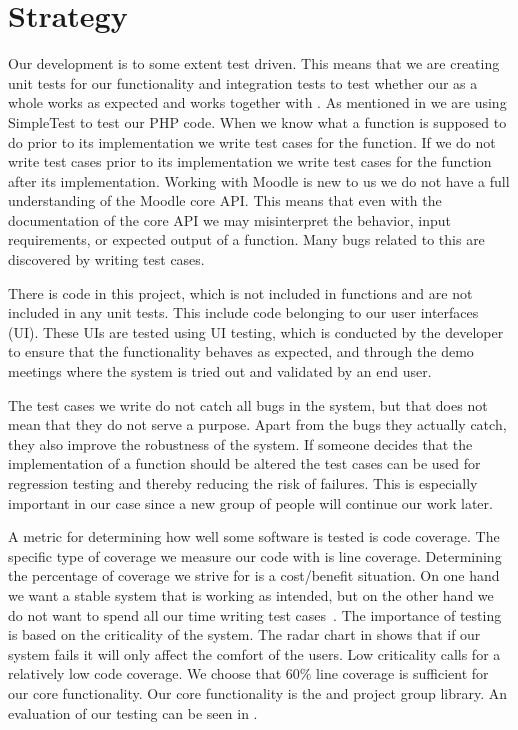 \section{Strategy}
\label{sec:strategy}
\newcommand{\idealCC}{$60\%$}
Our development is to some extent test driven.
This means that we are creating unit tests for our functionality and integration tests to test whether our \subsystem{} as a whole works as expected and works together with \moodle{}.
As mentioned in  we are using SimpleTest to test our PHP code.
When we know what a function is supposed to do prior to its implementation we write test cases for the function.
If we do not write test cases prior to its implementation we write test cases for the function after its implementation. 
Working with Moodle is new to us we do not have a full understanding of the Moodle core API.
This means that even with the documentation of the \moodle{} core API we may misinterpret the behavior, input requirements, or expected output of a function.
Many bugs related to this are discovered by writing test cases.

There is code in this project, which is not included in functions and are not included in any unit tests.
This include code belonging to our user interfaces (UI).
These UIs are tested using UI testing, which is conducted by the developer to ensure that the functionality behaves as expected, and through the demo meetings where the system is tried out and validated by an end user. 

The test cases we write do not catch all bugs in the system, but that does not mean that they do not serve a purpose.
Apart from the bugs they actually catch, they also improve the robustness of the system.
If someone decides that the implementation of a function should be altered the test cases can be used for regression testing and thereby reducing the risk of failures. 
This is especially important in our case since a new group of people will continue our work later.

A metric for determining how well some software is tested is code coverage. 
The specific type of coverage we measure our code with is line coverage. 
Determining the percentage of coverage we strive for is a cost/benefit situation.
On one hand we want a stable system that is working as intended, but on the other hand we do not want to spend all our time writing test cases~\cite[pp.~39-40]{Patton05}.
The importance of testing is based on the criticality of the system.
The radar chart in  shows that if our system fails it will only affect the comfort of the users.
Low criticality calls for a relatively low code coverage.
We choose that \idealCC{} line coverage is sufficient for our core functionality.
Our core functionality is the \admlib{} and project group library.
An evaluation of our testing can be seen in .

